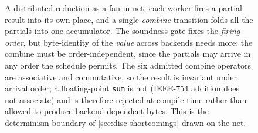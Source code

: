 \begin{figure}[tbp]
{}
  \caption[A distributed reduction as a fan-in net]{A distributed reduction as a
    fan-in net: each worker fires a partial result into its own place, and a
    single \emph{combine} transition folds all the partials into one accumulator.
    The soundness gate fixes the \emph{firing order}, but byte-identity of the
    \emph{value} across backends needs more: the combine must be order-independent,
    since the partials may arrive in any order the schedule permits. The six
    admitted combine operators are associative and commutative, so the result is
    invariant under arrival order; a floating-point \texttt{sum} is not (IEEE-754
    addition does not associate) and is therefore rejected at compile time rather
    than allowed to produce backend-dependent bytes. This is the determinism
    boundary of \cref{sec:disc-shortcomings} drawn on the net.}
  \label{fig:petri-reduce}
\end{figure}
